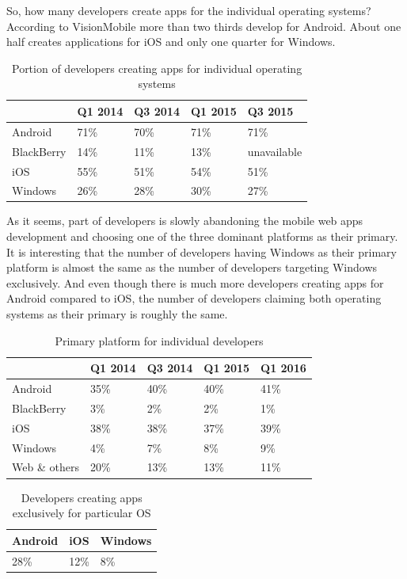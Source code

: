 \documentclass[english,master,public,dept460,male,cpdeclaration,oneside]{diploma}
\begin{document}
So, how many developers create apps for the individual operating systems? According to VisionMobile \cite{devEconomics} more than two thirds develop for Android. About one half creates applications for iOS and only one quarter for Windows.

\begin{table}
	\centering
	\caption{Portion of developers creating apps for individual operating systems}
	\begin{tabular}{l l l l l}
		\toprule
		 & Q1 2014 & Q3 2014 & Q1 2015 & Q3 2015 \\
		\midrule
		Android & 71\% & 70\% & 71\% & 71\% \\
		BlackBerry & 14\% & 11\% & 13\% & unavailable \\
		iOS & 55\% & 51\% & 54\% & 51\% \\
		Windows & 26\% & 28\% & 30\% & 27\% \\
		\midrule
	\end{tabular}
\end{table}

As it seems, part of developers is slowly abandoning the mobile web apps development and choosing one of the three dominant platforms as their primary. It is interesting that the number of developers having Windows as their primary platform is almost the same as the number of developers targeting Windows exclusively. And even though there is much more developers creating apps for Android compared to iOS, the number of developers claiming both operating systems as their primary is roughly the same.

\begin{table}
	\centering
	\caption{Primary platform for individual developers}
	\begin{tabular}{l l l l l}		
		\toprule
		 & Q1 2014 & Q3 2014 & Q1 2015 & Q1 2016 \\
		\midrule
		Android & 35\% & 40\% & 40\% & 41\% \\
		BlackBerry & 3\% & 2\% & 2\% & 1\% \\
		iOS & 38\% & 38\% & 37\% & 39\% \\
		Windows & 4\% & 7\% & 8\% & 9\% \\
		Web \& others & 20\% & 13\% & 13\% & 11\% \\
		\midrule
	\end{tabular}
\end{table}

\begin{table}
	\centering
	\caption{Developers creating apps exclusively for particular OS}
	\begin{tabular}{l l l}
		\toprule
		Android & iOS & Windows \\
		\midrule
		28\% & 12\% & 8\% \\
		\midrule
	\end{tabular}
\end{table}
\end{document}
